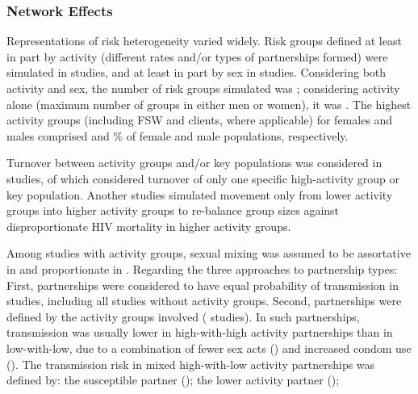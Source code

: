 \subsubsection{Network Effects}
\label{sss:res:network}
Representations of risk heterogeneity varied widely.
Risk groups defined at least in part by activity
(different rates and/or types of partnerships formed) were simulated in  studies,
and at least in part by sex in  studies.
Considering both activity and sex, the number of risk groups simulated was ;  %
considering activity alone (maximum number of groups in either men or women), it was .
The highest activity groups (including FSW and clients, where applicable) for females and males comprised
 and  \% of female and male populations, respectively.
\par
Turnover between activity groups and/or key populations %
was considered in  studies,
of which  considered turnover of only
one specific high-activity group or key population.
Another  studies simulated
movement only from lower activity groups into higher activity groups
to re-balance group sizes against disproportionate HIV mortality in higher activity groups.
\par
Among  studies with activity groups, sexual mixing was assumed to be
assortative in  and proportionate in .  %
Regarding the three approaches to partnership types:
First, partnerships were considered to have equal probability of transmission in
 studies, including all studies without activity groups.
Second, partnerships were defined by the activity groups involved ( studies).
In such partnerships, transmission was usually
lower in high-with-high activity partnerships than in low-with-low, due to a combination of
fewer sex acts () and
increased condom use ().
The transmission risk in mixed high-with-low activity partnerships was defined by:
the susceptible partner ();
the lower activity partner ();
